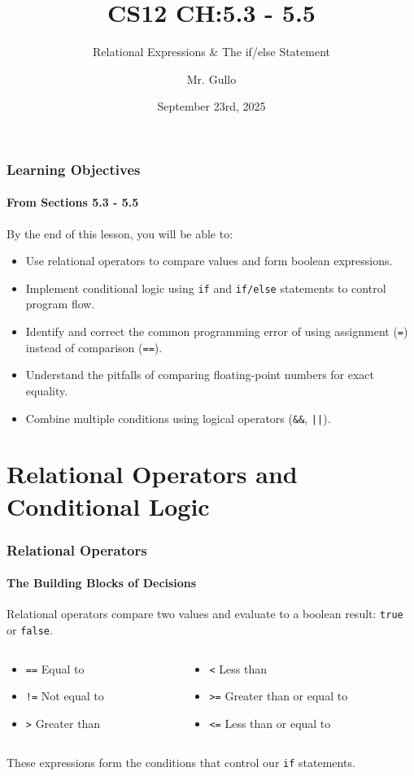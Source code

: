 \documentclass{beamer}
\title[Relational Logic and Control Flow]{CS12 CH:5.3 - 5.5}
\subtitle{Relational Expressions \& The if/else Statement}
\author[Mr. Gullo]{Mr. Gullo}
\date[Sep 23]{September 23rd, 2025}
\begin{document}
\frame{\titlepage}

\begin{frame}
\frametitle{Learning Objectives}
\framesubtitle{From Sections 5.3 - 5.5}
By the end of this lesson, you will be able to:
\begin{itemize}
    \item Use relational operators to compare values and form boolean expressions.
    \item Implement conditional logic using \texttt{if} and \texttt{if/else} statements to control program flow.
    \item Identify and correct the common programming error of using assignment (\texttt{=}) instead of comparison (\texttt{==}).
    \item Understand the pitfalls of comparing floating-point numbers for exact equality.
    \item Combine multiple conditions using logical operators (\texttt{\&\&}, \texttt{||}).
\end{itemize}
\end{frame}

\section{Relational Operators and Conditional Logic}

\begin{frame}
\frametitle{Relational Operators}
\framesubtitle{The Building Blocks of Decisions}
Relational operators compare two values and evaluate to a boolean result: \texttt{true} or \texttt{false}.

\begin{columns}[T]
    \begin{column}{0.5\textwidth}
        \begin{itemize}
            \item \texttt{==} \quad Equal to
            \item \texttt{!=} \quad Not equal to
            \item \texttt{>}  \quad Greater than
        \end{itemize}
    \end{column}
    \begin{column}{0.5\textwidth}
        \begin{itemize}
            \item \texttt{<}  \quad Less than
            \item \texttt{>=} \quad Greater than or equal to
            \item \texttt{<=} \quad Less than or equal to
        \end{itemize}
    \end{column}
\end{columns}

\pause

These expressions form the \alert{conditions} that control our \texttt{if} statements.
\end{frame}
\end{document}
